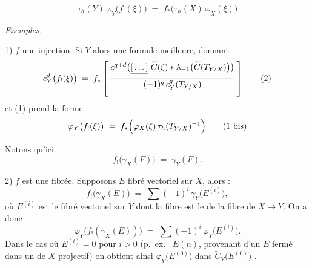 \documentclass[11pt,a4paper]{article}
\begin{document}
\[
  \tau_{h}(Y)\,\varphi_{Y}\bigl(f_{!}(\xi)\bigr)
  \;=\; f_{*}\bigl(\tau_{h}(X)\,\varphi_{X}(\xi)\bigr)
  \tag{1}
\]

\emph{Exemples.}

1) $f$ une injection. Si $Y$ \ill{} alors une formule meilleure, donnant
\[
  c^{d}_{Y}\bigl(f_{!}(\xi)\bigr)
  \;=\; f_{*}\left[\,
  \frac{c^{q+d}\bigl(\struck{\ill{}}\ \widetilde{C}(\xi)
    \ast \lambda_{-1}\bigl(\widetilde{C}(T_{Y/X})\bigr)\bigr)}
  {(-1)^{q}\,c^{q}_{Y}(T_{Y/X})}\,\right]
  \tag{2}
\]
 et (1) prend la forme
\[
  \varphi_{Y}\bigl(f_{!}(\xi)\bigr)
  \;=\; f_{*}\Bigl(\varphi_{X}(\xi)\,\tau_{h}(T_{Y/X})^{-1}\Bigr)
  \tag{1 bis}
\]

Notons qu'ici
\[
  f_{!}\bigl(\gamma_{X}(F)\bigr) \;=\; \gamma_{Y}(F) .
\]

2) $f$ est une  fibrée. Supposons $E$ fibré vectoriel
sur $X$, alors \ill{} :
\[
  f_{!}\bigl(\gamma_{X}(E)\bigr) \;=\; \sum (-1)^{i}\,\gamma_{Y}\bigl(E^{(i)}\bigr) ,
\]
où $E^{(i)}$ est le fibré vectoriel sur $Y$ dont la fibre 
\ill{} est le   \ill{} de la fibre de
$X \to Y$. On a donc
\[
  \varphi_{Y}\bigl(f_{!}(\gamma_{X}(E))\bigr)
  \;=\; \sum (-1)^{i}\,\varphi_{Y}\bigl(E^{(i)}\bigr) .
\]
Dans le cas où $E^{(i)} = 0$ pour $i > 0$ (p.\ ex.\ \ill{} \ill{} \ill{}
 \ill{} $E(n)$, \ill{} provenant d'un \ill{}
\ill{} $E$ \ill{} \ill{}  fermé dans un \ill{}
 de $X$ \ill{} \ill{} projectif) on obtient ainsi
$\varphi_{Y}\bigl(E^{(0)}\bigr)$ dans $\widetilde{C}_{Y}\bigl(E^{(0)}\bigr)$
\ill{} \struck{\ill{}}  .
 \ill{} \ill{} \ill{} \ill{}
\end{document}

